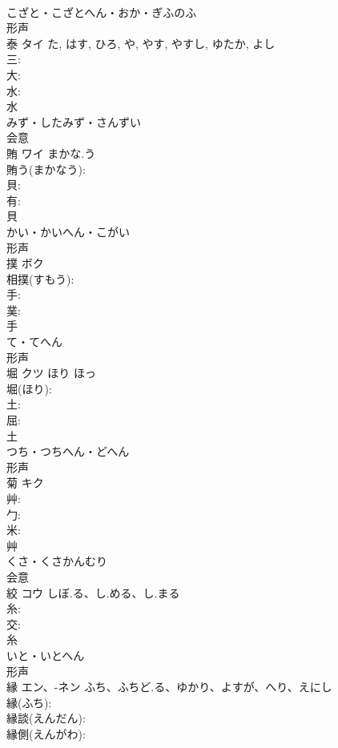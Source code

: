 \documentclass[8pt]{extreport}
\begin{document}
\begin{CJK}{UTF8}{min}
\\	こざと・こざとへん・おか・ぎふのふ	
\\	形声 
\\	泰	タイ		た, はす, ひろ, や, やす, やすし, ゆたか, よし	
\\	三: 
\\	大: 
\\	水: 
\\	水	
\\	みず・したみず・さんずい	
\\	会意 
\\	賄	ワイ	まかな.う		
\\	賄う(まかなう): 
\\	貝: 
\\	有: 
\\	貝	
\\	かい・かいへん・こがい	
\\	形声 
\\	撲	ボク			
\\	相撲(すもう): 
\\	手: 
\\	菐: 
\\	手	
\\	て・てへん	
\\	形声 
\\	堀	クツ	ほり	ほっ	
\\	堀(ほり): 
\\	土: 
\\	屈: 
\\	土	
\\	つち・つちへん・どへん	
\\	形声 
\\	菊	キク			
\\	艸: 
\\	勹: 
\\	米: 
\\	艸	
\\	くさ・くさかんむり	
\\	会意 
\\	絞	コウ	しぼ.る、し.める、し.まる		
\\	糸: 
\\	交: 
\\	糸	
\\	いと・いとへん	
\\	形声 
\\	縁	エン、-ネン	ふち、ふちど.る、ゆかり、よすが、へり、えにし		
\\	縁(ふち): 
\\	縁談(えんだん): 
\\	縁側(えんがわ): 

\end{CJK}
\end{document}
